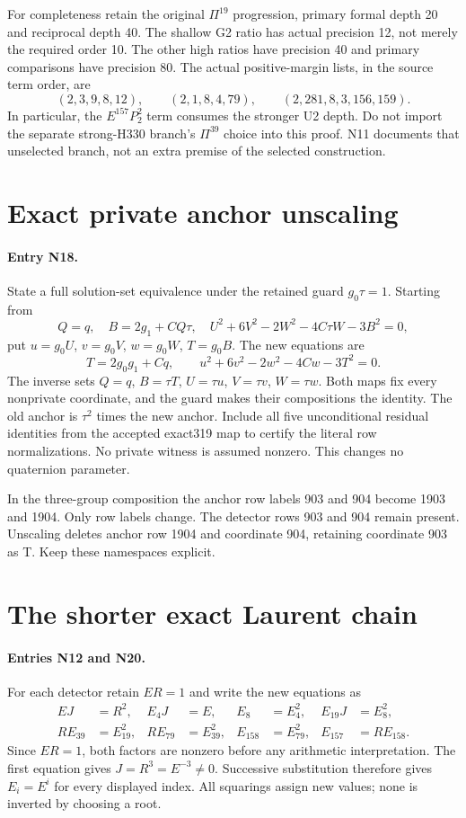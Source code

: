 \documentclass{article}
\begin{document}
For completeness retain the original $\Pi^{19}$ progression, primary
formal depth 20 and reciprocal depth 40. The shallow G2 ratio has actual
precision 12, not merely the required order 10. The other high ratios
have precision 40 and primary comparisons have precision 80.
The actual positive-margin lists, in the source term order, are
\[
 (2,3,9,8,12),\qquad (2,1,8,4,79),\qquad
 (2,281,8,3,156,159).
\]
In particular, the $E^{157}P_2^2$ term consumes the stronger U2 depth.
Do not import the separate strong-H330 branch's $\Pi^{39}$ choice into
this proof. N11 documents that unselected branch, not an extra premise
of the selected construction.

\section{Exact private anchor unscaling}
\label{outline:unscale}
\paragraph{Entry N18.}
State a full solution-set equivalence under the retained guard
$g_0\tau=1$. Starting from
\[
 Q=q,\quad B=2g_1+CQ\tau,\quad
 U^2+6V^2-2W^2-4C\tau W-3B^2=0,
\]
put $u=g_0U$, $v=g_0V$, $w=g_0W$, $T=g_0B$. The new equations are
\[
 T=2g_0g_1+Cq,\qquad u^2+6v^2-2w^2-4Cw-3T^2=0.
\]
The inverse sets $Q=q$, $B=\tau T$, $U=\tau u$, $V=\tau v$,
$W=\tau w$. Both maps fix every nonprivate coordinate, and the guard
makes their compositions the identity. The old anchor is $\tau^2$
times the new anchor. Include all five unconditional residual identities
from the accepted exact319 map to certify the literal row normalizations.
No private witness is assumed nonzero. This changes no quaternion parameter.

In the three-group composition the anchor row labels 903 and 904 become
1903 and 1904. Only row labels change. The detector rows 903 and 904
remain present. Unscaling deletes anchor row 1904 and coordinate 904,
retaining coordinate 903 as T. Keep these namespaces explicit.

\section{The shorter exact Laurent chain}
\label{outline:chain}
\paragraph{Entries N12 and N20.}
For each detector retain $ER=1$ and write the new equations as
\begin{align*}
 EJ&=R^2,&E_4J&=E,&E_8&=E_4^2,&E_{19}J&=E_8^2,\\
 RE_{39}&=E_{19}^2,&RE_{79}&=E_{39}^2,&
 E_{158}&=E_{79}^2,&E_{157}&=RE_{158}.
\end{align*}
Since $ER=1$, both factors are nonzero before any arithmetic
interpretation. The first equation gives $J=R^3=E^{-3}\ne0$.
Successive substitution therefore gives $E_i=E^i$ for every displayed
index. All squarings assign new values; none is inverted by choosing a root.
\end{document}
